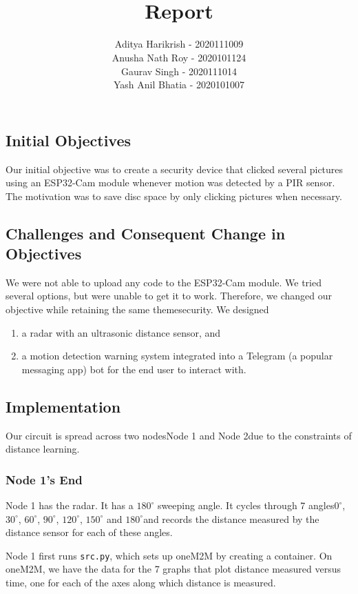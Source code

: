 \documentclass[12pt, a4paper]{article}
\title{\uwave{Project Surveillance}\\Report}
\author{Aditya Harikrish - 2020111009\\Anusha Nath Roy - 2020101124\\Gaurav Singh - 2020111014\\Yash Anil Bhatia - 2020101007
}
\date{}
\theoremstyle{definition}
\theoremstyle{remark}
\begin{document}
\maketitle

\subsection*{Initial Objectives}
Our initial objective was to create a security device that clicked several pictures using an ESP32-Cam module whenever motion was detected by a PIR sensor. The motivation was to save disc space by only clicking pictures when necessary.

\subsection*{Challenges and Consequent Change in Objectives}
We were not able to upload any code to the ESP32-Cam module. We tried several options, but were unable to get it to work. Therefore, we changed our objective while retaining the same theme\textemdash security. We designed
\begin{enumerate}
    \item a radar with an ultrasonic distance sensor, and
    \item a motion detection warning system integrated into a Telegram (a popular messaging app) bot for the end user to interact with.
\end{enumerate}

\subsection*{Implementation}
Our circuit is spread across two nodes\textemdash Node 1 and Node 2\textemdash due to the constraints of distance learning.

\subsubsection*{Node 1's End}
Node 1 has the radar. It has a $180^\circ$ sweeping angle. It cycles through 7 angles\textemdash $0^\circ$, $30^\circ$, $60^\circ$, $90^\circ$, $120^\circ$, $150^\circ$ and $180^\circ$\textemdash and records the distance measured by the distance sensor for each of these angles.

Node 1 first runs \texttt{src.py}, which sets up oneM2M by creating a container. On oneM2M, we have the data for the 7 graphs that plot distance measured versus time, one for each of the axes along which distance is measured.
\end{document}
